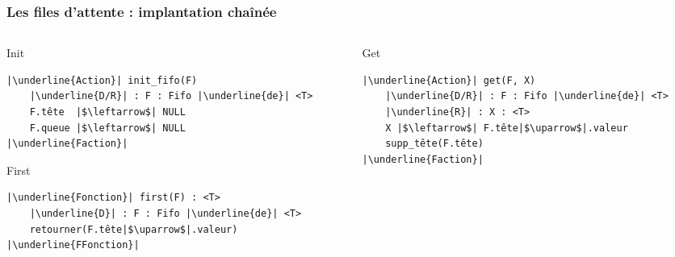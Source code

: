 \documentclass[table,handout,tikz,12pt,svgnames]{beamer}
\begin{document}
\begin{frame}[fragile=singleslide]
	\frametitle{Les files d'attente : implantation chaînée}
	\begin{block}{}
		\begin{columns}[T]
			\hspace{-0.5cm}
			\begin{column}{0.7\textwidth}
				\begin{block}{Init} %
					\begin{verbatim}
|\underline{Action}| init_fifo(F)
	|\underline{D/R}| : F : Fifo |\underline{de}| <T>
	F.tête  |$\leftarrow$| NULL
	F.queue |$\leftarrow$| NULL
|\underline{Faction}|
					\end{verbatim}
				\end{block}
				\begin{block}{First} %
					\begin{verbatim}
|\underline{Fonction}| first(F) : <T>
	|\underline{D}| : F : Fifo |\underline{de}| <T>
	retourner(F.tête|$\uparrow$|.valeur)
|\underline{FFonction}|
					\end{verbatim}
				\end{block}
			\end{column}
			\hspace{-3.5cm}
			\vrule{}
			\hspace{0.3cm}
			\begin{column}{0.38\textwidth}
				\begin{block}{Get} %
					\begin{verbatim}
|\underline{Action}| get(F, X)
	|\underline{D/R}| : F : Fifo |\underline{de}| <T>
	|\underline{R}| : X : <T>
	X |$\leftarrow$| F.tête|$\uparrow$|.valeur
	supp_tête(F.tête)
|\underline{Faction}|
					\end{verbatim}
				\end{block}		
			\end{column}
		\end{columns}
	\end{block}
\end{frame}
\end{document}
